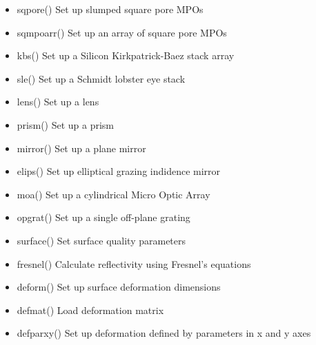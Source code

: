 \documentclass[letterpaper,10pt,english]{sphinxmanual}
\begin{document}
\begin{itemize}
\item {} 
sqpore() Set up slumped square pore MPOs

\item {} 
sqmpoarr() Set up an array of square pore MPOs

\item {} 
kbs() Set up a Silicon Kirkpatrick-Baez stack array

\item {} 
sle() Set up a Schmidt lobster eye stack

\end{itemize}

\begin{itemize}
\item {} 
lens() Set up a lens

\item {} 
prism() Set up a prism

\item {} 
mirror() Set up a plane mirror

\item {} 
elips() Set up elliptical grazing indidence mirror

\item {} 
moa() Set up a cylindrical Micro Optic Array

\item {} 
opgrat() Set up a single off-plane grating

\end{itemize}

\begin{itemize}
\item {} 
surface() Set surface quality parameters

\item {} 
fresnel() Calculate reflectivity using Fresnel’s equations

\item {} 
deform() Set up surface deformation dimensions

\item {} 
defmat() Load deformation matrix

\item {} 
defparxy() Set up deformation defined by parameters in x and y axes

\end{itemize}
\end{document}
